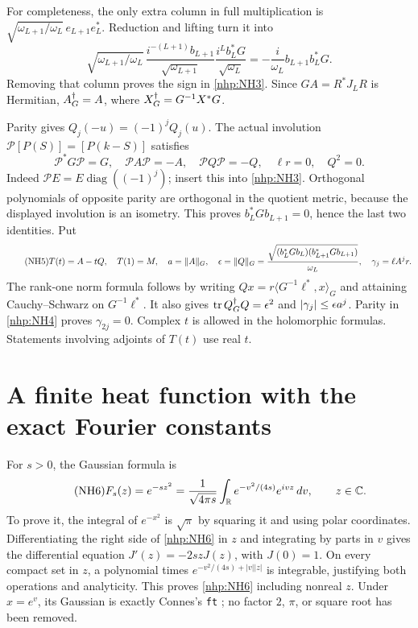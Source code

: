 \documentclass[11pt]{article}
\begin{document}
For completeness, the only extra column in full multiplication
is \(\sqrt{\omega_{L+1}/\omega_L}\,e_{L+1}e_L^*\).
Reduction and lifting turn it into
\[
\sqrt{\omega_{L+1}/\omega_L}\,
\frac{i^{-(L+1)}b_{L+1}}{\sqrt{\omega_{L+1}}}
\frac{i^Lb_L^*G}{\sqrt{\omega_L}}
=-\frac{i}{\omega_L}b_{L+1}b_L^*G .
\]
Removing that column proves the sign in \eqref{nhp:NH3}.
Since \(GA=R^*J_LR\) is Hermitian,
\(A^\dagger_G=A\), where \(X^\dagger_G=G^{-1}X^*G\).

Parity gives \(Q_j(-u)=(-1)^jQ_j(u)\).
The actual involution \(\mathcal P[P(S)]=[P(k-S)]\)
satisfies
\begin{equation}\tag{NH4}\label{nhp:NH4}
\mathcal P^*G\mathcal P=G,\quad
\mathcal P A\mathcal P=-A,\quad
\mathcal P Q\mathcal P=-Q,\quad
\ell r=0,\quad Q^2=0 .
\end{equation}
Indeed \(\mathcal P E=E\operatorname{diag}((-1)^j)\);
insert this into \eqref{nhp:NH3}. Orthogonal polynomials of
opposite parity are orthogonal in the quotient metric,
because the displayed involution is an isometry.
This proves \(b_L^*Gb_{L+1}=0\), hence the last two
identities. Put
\begin{equation}\tag{NH5}\label{nhp:NH5}
T(t)=A-tQ,\quad T(1)=M,\quad
a=\|A\|_G,\quad
\epsilon=\|Q\|_G
=\frac{\sqrt{(b_L^*Gb_L)(b_{L+1}^*Gb_{L+1})}}{\omega_L},
\quad \gamma_j=\ell A^jr .
\end{equation}
The rank-one norm formula follows by writing
\(Qx=r\langle G^{-1}\ell^*,x\rangle_G\) and attaining
Cauchy--Schwarz on \(G^{-1}\ell^*\). It also gives
\(\operatorname{tr} Q^\dagger_G Q=\epsilon^2\) and
\(|\gamma_j|\le\epsilon a^j\).
Parity in \eqref{nhp:NH4} proves \(\gamma_{2j}=0\).
Complex \(t\) is allowed in the holomorphic formulas.
Statements involving adjoints of \(T(t)\) use real \(t\).

\section{A finite heat function with the exact Fourier constants}

For \(s>0\), the Gaussian formula is
\begin{equation}\tag{NH6}\label{nhp:NH6}
F_s(z)=e^{-sz^2}
=\frac1{\sqrt{4\pi s}}\int_\mathbb R e^{-v^2/(4s)}e^{ivz}\,dv,
\qquad z\in\mathbb C .
\end{equation}
To prove it, the integral of \(e^{-x^2}\) is \(\sqrt\pi\)
by squaring it and using polar coordinates. Differentiating
the right side of \eqref{nhp:NH6} in \(z\) and integrating
by parts in \(v\) gives the differential equation
\(J'(z)=-2szJ(z)\), with \(J(0)=1\).
On every compact set in \(z\), a polynomial times
\(e^{-v^2/(4s)+|v||z|}\) is integrable, justifying both
operations and analyticity. This proves \eqref{nhp:NH6}
including nonreal \(z\). Under \(x=e^v\), its Gaussian
is exactly Connes's \texttt{ft} \cite{nhp:ConnesHeat};
no factor \(2\), \(\pi\), or square root has been removed.
\end{document}
